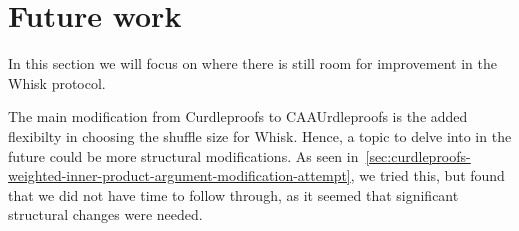 \section{Future work}\label{sec:future-works}
In this section we will focus on where there is still room for improvement in the Whisk protocol.

The main modification from Curdleproofs to CAAUrdleproofs is the added flexibilty in choosing the shuffle size for Whisk.
Hence, a topic to delve into in the future could be more structural modifications.
As seen in~\autoref{sec:curdleproofs-weighted-inner-product-argument-modification-attempt}, we tried this, but found that we did not have time to follow through, as it seemed that significant structural changes were needed.